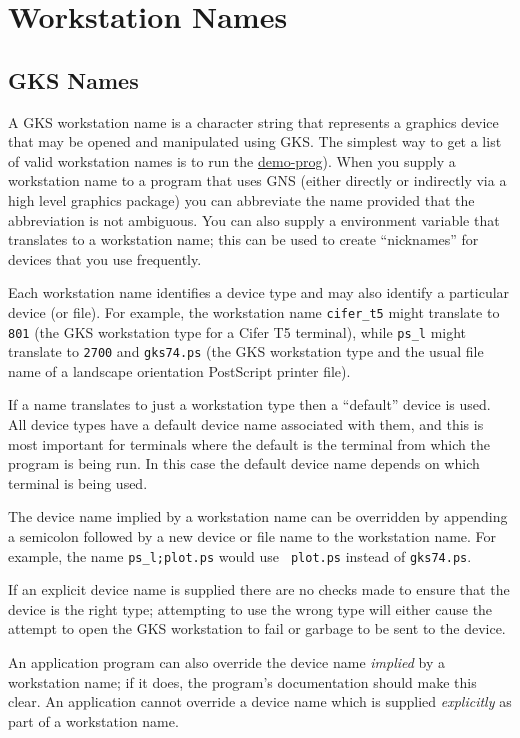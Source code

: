 \section{Workstation Names}\label{wn}
\subsection{GKS Names}

A GKS workstation name is a character string that represents a graphics device
that may be opened and manipulated using GKS. 
The simplest way to get a list of valid workstation names is to run the
\hyperref{demonstration program}{demonstration program (section~}{}{demo-prog}).
When you supply a workstation name to a program that uses GNS (either directly
or indirectly via a high level graphics package) you can abbreviate the name
provided that the abbreviation is not ambiguous. You can also supply a
environment variable that translates to a workstation name; this can be 
used to create ``nicknames'' for devices that you use frequently.

Each workstation name identifies a device type and may also identify a
particular device (or file). For example, the workstation name {\tt cifer\_t5}
might translate to {\tt 801} (the GKS workstation type for a Cifer T5
terminal), while {\tt ps\_l} might translate to {\tt 2700} and {\tt gks74.ps}
(the GKS workstation type and the usual file name of a landscape
orientation PostScript printer file). 

If a name translates to just a workstation type then a  ``default'' device
is used. All device types have a default device name associated with them,
and this is most important for terminals where the default is the terminal
from which the program is being run. In this case the default device name
depends on which terminal is being used.

The device name implied by a workstation name can be overridden by
appending a semicolon followed by a new device or file name to the
workstation name. For example, the name {\tt ps\_l;plot.ps} would use {\tt
plot.ps} instead of {\tt gks74.ps}. 

If an explicit device name is supplied there are no checks made to ensure
that the device is the right type; attempting to use the wrong type will
either cause the attempt to open the GKS workstation to fail or garbage to
be sent to the device.

An application program can also override the device name {\em implied\/} by a
workstation name; if it does, the program's documentation should make this
clear. An application cannot override a device name which is supplied
{\em explicitly\/} as part of a workstation name.

